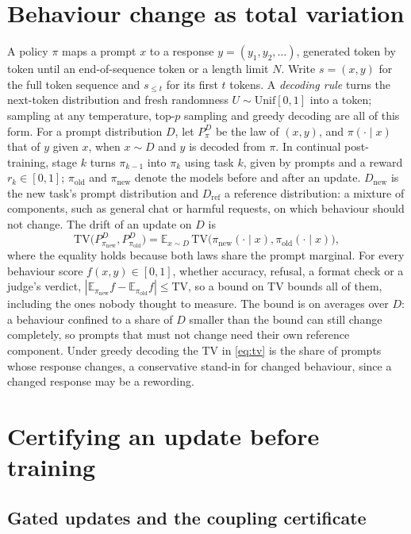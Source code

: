 \documentclass{article}
\theoremstyle{plain}
\theoremstyle{definition}
\theoremstyle{remark}
\newcommand{\E}{\mathbb{E}}
\newcommand{\TV}{\mathrm{TV}}
\newcommand{\Dref}{D_{\mathrm{ref}}}
\newcommand{\Dnew}{D_{\mathrm{new}}}
\newcommand{\pold}{\pi_{\mathrm{old}}}
\newcommand{\pnew}{\pi_{\mathrm{new}}}
\begin{document}
\section{Behaviour change as total variation}
\label{sec:setting}

A policy $\pi$ maps a prompt $x$ to a response $y=(y_1,y_2,\dots)$, generated token by token until an
end-of-sequence token or a length limit $N$. Write $s=(x,y)$ for the full token sequence and $s_{\le t}$ for its
first $t$ tokens. A \emph{decoding rule} turns the next-token distribution and fresh randomness
$U\sim\mathrm{Unif}[0,1]$ into a token; sampling at any temperature, top-$p$ sampling and greedy decoding are all of
this form. For a prompt distribution $D$, let $P^D_\pi$ be the law of $(x,y)$, and $\pi(\cdot\mid x)$ that of $y$ given $x$, when $x\sim D$ and $y$ is
decoded from $\pi$. In continual post-training, stage $k$ turns $\pi_{k-1}$ into $\pi_k$ using task $k$, given by
prompts and a reward $r_k\in[0,1]$; $\pold$ and $\pnew$ denote the models before and after an update. $\Dnew$ is
the new task's prompt distribution and $\Dref$ a reference distribution: a mixture of components, such
as general chat or harmful requests, on which behaviour should not change. The drift of an update on $D$ is
\begin{equation}
\TV\big(P^D_{\pnew},P^D_{\pold}\big)=\E_{x\sim D}\,\TV\big(\pnew(\cdot\mid x),\pold(\cdot\mid x)\big),
\label{eq:tv}
\end{equation}
where the equality holds because both laws share the prompt marginal. For every behaviour score
$f(x,y)\in[0,1]$, whether accuracy, refusal, a format check or a judge's verdict, $|\E_{\pnew}f-\E_{\pold}f|\le\TV$,
so a bound on TV bounds all of them, including the ones nobody thought to measure. The bound is on averages over
$D$: a behaviour confined to a share of $D$ smaller than the bound can still change completely, so prompts that must
not change need their own reference component. Under greedy decoding the TV in \cref{eq:tv} is the share of prompts
whose response changes, a conservative stand-in for changed behaviour, since a changed response may be a rewording.

\section{Certifying an update before training}
\label{sec:certificate}

\subsection{Gated updates and the coupling certificate}
\end{document}
